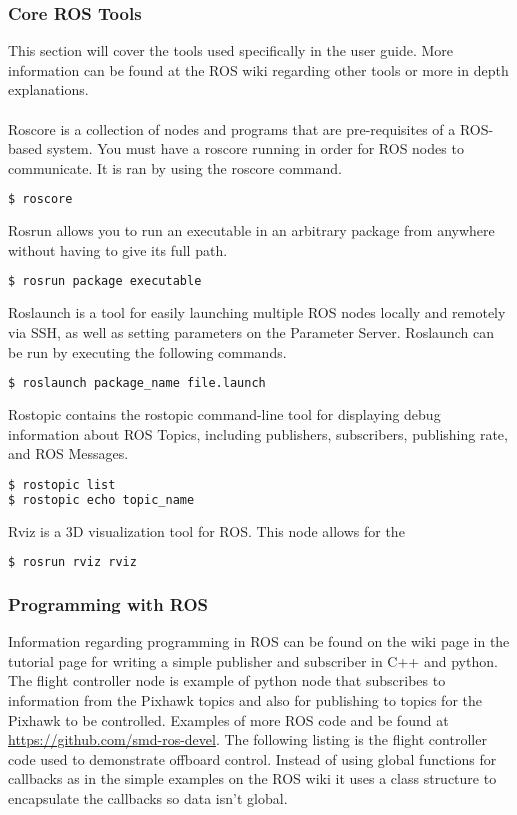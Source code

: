 \subsubsection{Core ROS Tools}
This section will cover the tools used specifically in the user guide. More information can be found at the ROS wiki regarding other tools or more in depth explanations.\\
\\
Roscore is a collection of nodes and programs that are pre-requisites of a ROS-based system. You must have a roscore running in order for ROS nodes to communicate. It is ran by using the roscore command.
\begin{lstlisting}[language=bash]
$ roscore
\end{lstlisting}
Rosrun allows you to run an executable in an arbitrary package from anywhere without having to give its full path.
\begin{lstlisting}[language=bash]
$ rosrun package executable
\end{lstlisting}
Roslaunch is a tool for easily launching multiple ROS nodes locally and remotely via SSH, as well as setting parameters on the Parameter Server. Roslaunch can be run by executing the following commands.
\begin{lstlisting}[language=bash]
$ roslaunch package_name file.launch
\end{lstlisting}
Rostopic contains the rostopic command-line tool for displaying debug information about ROS Topics, including publishers, subscribers, publishing rate, and ROS Messages.
\begin{lstlisting}[language=bash]
$ rostopic list
$ rostopic echo topic_name
\end{lstlisting}
Rviz is a 3D visualization tool for ROS. This node allows for the 
\begin{lstlisting}[language=bash]
$ rosrun rviz rviz
\end{lstlisting}
\subsubsection{Programming with ROS}
Information regarding programming in ROS can be found on the wiki page in the tutorial page for writing a simple publisher and subscriber in C++ and python. The flight controller node is example of python node that subscribes to information from the Pixhawk topics and also for publishing to topics for the Pixhawk to be controlled. Examples of more ROS code and be found at \url{https://github.com/smd-ros-devel}. The following listing is the flight controller code used to demonstrate offboard control. Instead of using global functions for callbacks as in the simple examples on the ROS wiki it uses a class structure to encapsulate the callbacks so data isn't global.

